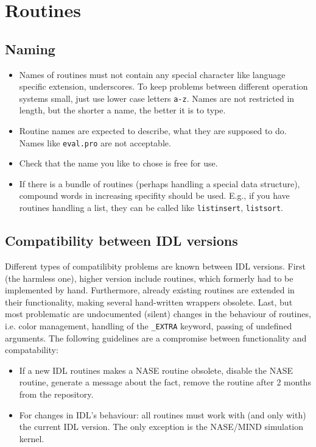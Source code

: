 \documentclass[12pt]{article}
\begin{document}
\section{Routines}
\subsection{Naming}
\begin{itemize}
\item Names of routines must not contain any special character like language specific extension, underscores. To keep problems between different operation systems small, just use lower case letters \texttt{a-z}. Names are not restricted in length, but the shorter a name, the better it is to type.  
\item Routine names are expected to describe, what they are supposed to do. Names like \texttt{eval.pro} are not acceptable.
\item Check that the name you like to chose is free for use.
\item If there is a bundle of routines (perhaps handling a special data structure), compound words in increasing specifity should be used. E.g., if you have routines handling a list, they can be called like \texttt{listinsert}, \texttt{listsort}.
\end{itemize}


\subsection{Compatibility between IDL versions}
Different types of compatilibity problems are known between IDL versions. First (the harmless one), higher version include routines, which formerly had to be implemented by hand. Furthermore, already existing routines are extended in their functionality, making several hand-written wrappers obsolete. Last, but most problematic are undocumented (silent) changes in the behaviour of routines, i.e. color management, handling of the \texttt{\_EXTRA} keyword, passing of undefined arguments. The following guidelines are a compromise between functionality and compatability:
\begin{itemize}
\item If a new IDL routines makes a NASE routine obsolete, disable the NASE routine, generate a message about the fact, remove the routine after 2 months from the repository.
\item For changes in IDL's behaviour: all routines must work with (and only with) the current IDL version. The only exception is the NASE/MIND simulation kernel.
\end{itemize}
\end{document}
